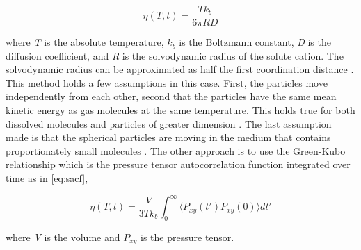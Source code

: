 \documentclass[review]{elsarticle}
\begin{document}
\begin{equation}
  \label{eq:SES}
     \eta(T,t) = \frac{Tk_b}{6\pi RD}
\end{equation}

\noindent where \textit{T} is the absolute temperature, \textit{$k_b$} is the Boltzmann constant, \textit{D} is the diffusion coefficient, and \textit{R} is the solvodynamic radius of the solute cation. The solvodynamic radius can be approximated as half the first coordination distance \cite{SONG2017462}. This method holds a few assumptions in this case. First, the particles move independently from each other, second that the particles have the same mean kinetic energy as gas molecules at the same temperature. This holds true for both dissolved molecules and particles of greater dimension \cite{Miller1924}. The last assumption made is that the spherical particles are moving in the medium that contains proportionately small molecules \cite{Miller1924}. The other approach is to use the Green-Kubo relationship which is the pressure tensor autocorrelation function integrated over time \cite{rapaport2004art} as in \cref{eq:sacf},

\begin{equation}
  \label{eq:sacf}
     \eta(T,t) = \frac{V}{3Tk_b}\int_0^\infty \langle P_{xy}(t')P_{xy}(0)\rangle dt'
\end{equation}

\noindent where \textit{V} is the volume and \textit{$P_{xy}$} is the pressure tensor.
\end{document}
